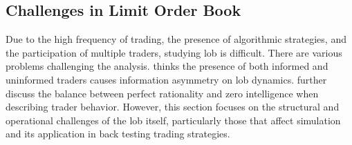 \subsection{Challenges in Limit Order Book}
Due to the high frequency of trading, the presence of algorithmic strategies, and the participation of multiple traders, studying \gls{lob} is difficult. There are various problems challenging the analysis. \cite{drame2020limitorderbooklob} thinks the presence of both informed and uninformed traders causes information asymmetry on \gls{lob} dynamics. \cite{gould_limit_2013} further discuss the balance between perfect rationality and zero intelligence when describing trader behavior. However, this section focuses on the structural and operational challenges of the \gls{lob} itself, particularly those that affect simulation and its application in back testing trading strategies.
